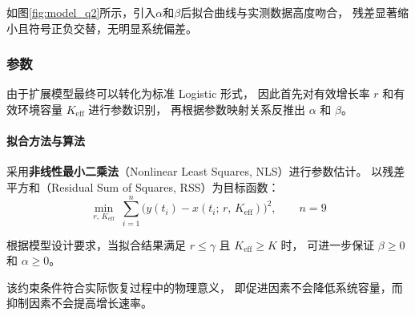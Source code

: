 \documentclass[12pt,a4paper]{ctexart}
\begin{document}
如图\ref{fig:model_q2}所示，引入$\alpha$和$\beta$后拟合曲线与实测数据高度吻合，
残差显著缩小且符号正负交替，无明显系统偏差。

\subsubsection{参数}

由于扩展模型最终可以转化为标准 Logistic 形式，
因此首先对有效增长率 $r$ 和有效环境容量 $K_{\text{eff}}$ 进行参数识别，
再根据参数映射关系反推出 $\alpha$ 和 $\beta$。

\paragraph{拟合方法与算法}

采用\textbf{非线性最小二乘法}（Nonlinear Least Squares, NLS）进行参数估计。
以残差平方和（Residual Sum of Squares, RSS）为目标函数：
\begin{equation}
\min_{r,\,K_{\text{eff}}} \;
\sum_{i=1}^{n} \bigl(y(t_i) - x(t_i;\, r,\,K_{\text{eff}})\bigr)^2,\qquad
n = 9
\end{equation}

根据模型设计要求，当拟合结果满足
$r\le\gamma$ 且 $K_{\text{eff}}\ge K$ 时，
可进一步保证 $\beta\ge0$ 和 $\alpha\ge0$。

该约束条件符合实际恢复过程中的物理意义，
即促进因素不会降低系统容量，而抑制因素不会提高增长速率。
\end{document}
